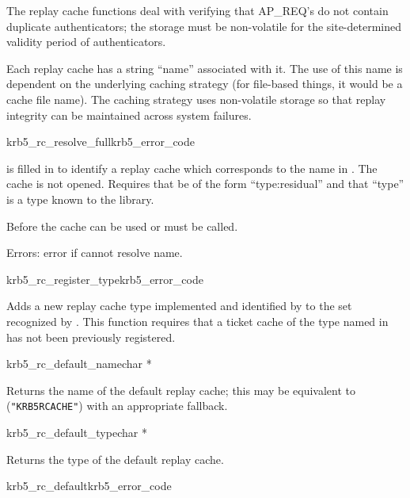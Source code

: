 The replay cache functions deal with verifying that AP_REQ's do not
contain duplicate authenticators; the storage must be non-volatile for
the site-determined validity period of authenticators.

Each replay cache has a string ``name'' associated with it.  The use of
this name is dependent on the underlying caching strategy (for
file-based things, it would be a cache file name).  The
caching strategy uses non-volatile storage so that replay
integrity can be maintained across system failures.

\begin{funcdecl}{krb5_rc_resolve_full}{krb5_error_code}{\funcinout}
\funcin
{}
\end{funcdecl}

 is filled in to identify a replay cache which
corresponds to the name in .  The cache is not opened.
Requires that  be of the form ``type:residual''
and that ``type'' is a type known to the library.

Before the cache can be used  or
 must be called.

Errors: error if cannot resolve name.

\begin{funcdecl}{krb5_rc_register_type}{krb5_error_code}{\funcin}
\end{funcdecl}
Adds a new replay cache type implemented and identified by
 to the set recognized by
.  This function requires that a ticket
cache of the type named in 
 has not been previously registered.


\begin{funcdecl}{krb5_rc_default_name}{char *}{\funcvoid}
\end{funcdecl}
Returns  the name of the default replay cache; this may be equivalent to
({\tt "KRB5RCACHE"}) with an appropriate fallback.

\begin{funcdecl}{krb5_rc_default_type}{char *}{\funcvoid}
\end{funcdecl}

Returns the type of the default replay cache.

\begin{funcdecl}{krb5_rc_default}{krb5_error_code}{\funcinout}
\end{funcdecl}

